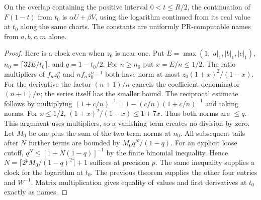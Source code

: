 \begin{proposition}
On the overlap containing the positive interval $0<t\le R/2$,
the continuation of $F(1-t)$ from $t_0$ is $\alpha U+\beta V$, using
the logarithm continued from its real value at $t_0$ along the same
charts. The constants are uniformly PR-computable names from
$a,b,c,m$ alone.
\end{proposition}
\begin{proof}
Here is a clock even when $z_0$ is near one. Put
$E=\max(1,|a|_1,|b|_1,|c|_1)$,
$n_0=\lceil32 E/t_0\rceil$, and $q=1-t_0/2$. For $n\ge n_0$ put
$x=E/n\le 1/2$. The ratio multipliers of $f_n z_0^n$ and
$n f_n z_0^{n-1}$ both have norm at most
$z_0(1+x)^2/(1-x)$. For the derivative the factor $(n+1)/n$ cancels the
coefficient denominator $(n+1)/n$; the series itself has the smaller
bound. The reciprocal estimate follows by multiplying
$(1+c/n)^{-1}=1-(c/n)(1+c/n)^{-1}$ and taking norms. For $x\le1/2$,
$(1+x)^2/(1-x)\le1+7x$. Thus both norms are $\le q$. This argument uses
multipliers, so a vanishing term creates no division by zero. Let $M_0$ be
one plus the sum of the two term norms at $n_0$. All subsequent tails
after $N$ further terms are bounded by $M_0q^N/(1-q)$. For an explicit
loose cutoff, $q^N\le [1+N(1-q)]^{-1}$ by the finite binomial inequality.
Hence $N=\lceil 2^p M_0/(1-q)^2\rceil+1$ suffices at precision $p$.
The same inequality supplies a clock for the logarithm at $t_0$.
The previous theorem supplies the other four entries and $W^{-1}$.
Matrix multiplication gives equality of values and first derivatives
at $t_0$ exactly as names.


\end{proof}
